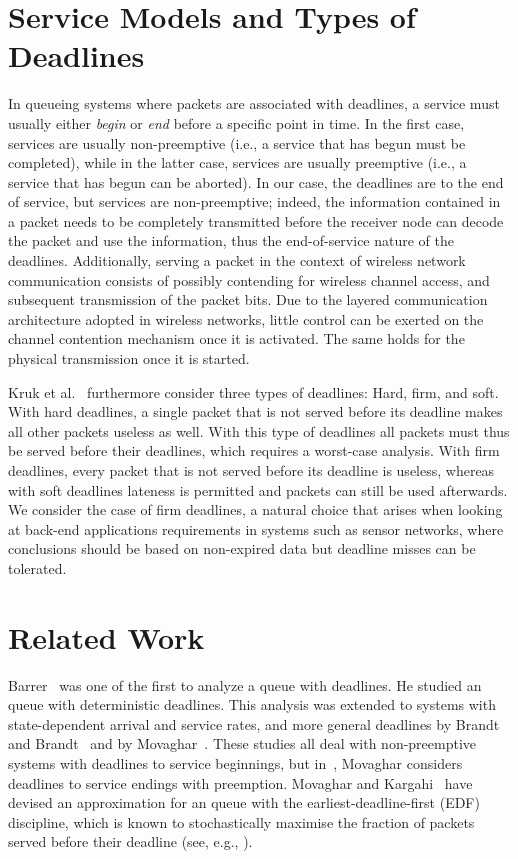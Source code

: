 \documentclass[preprint,12pt]{elsarticle}
\theoremstyle{definition}
\theoremstyle{plain}
\theoremstyle{remark}
\begin{document}
\section{Service Models and Types of Deadlines}\label{section:deadlines}
In queueing systems where packets are associated with deadlines, a service must usually either \emph{begin} or \emph{end} before a specific point in time. In the first case, services are usually non-preemptive (i.e., a service that has begun must be completed), while in the latter case, services are usually preemptive (i.e., a service that has begun can be aborted). In our case, the deadlines are to the end of service, but services are non-preemptive; indeed, the information contained in a packet needs to be completely transmitted before the receiver node can decode the packet and use the information, thus the end-of-service nature of the deadlines. Additionally, serving a packet in the context of wireless network communication consists of possibly contending for wireless channel access, and subsequent transmission of the packet bits. Due to the layered communication architecture adopted in wireless networks, little control can be exerted on the channel contention mechanism once it is activated. The same holds for the physical transmission once it is started.

Kruk et al.~\cite{kruk_edf_heavy_traffic_networks} furthermore consider three types of deadlines: Hard, firm, and soft. With hard deadlines, a single packet that is not served before its deadline makes all other packets useless as well. With this type of deadlines all packets must thus be served before their deadlines, which requires a worst-case analysis. With firm deadlines, every packet that is not served before its deadline is useless, whereas with soft deadlines lateness is permitted and packets can still be used afterwards. We consider the case of firm deadlines, a natural choice that arises when looking at back-end applications requirements in systems such as sensor networks, where conclusions should be based on non-expired data but deadline misses can be tolerated.

\section{Related Work} \label{section:related-works}
Barrer~\cite{Barrer_indifferent_clerks,Barrer_ordered_service} was one of the first to analyze a queue with deadlines. He studied an  queue with deterministic deadlines. This analysis was extended to systems with state-dependent arrival and service rates, and more general deadlines by Brandt and Brandt~\cite{Brandt_MMs,Brandt_MMs_deadlines} and by Movaghar~\cite{movaghar_beginnings_fifo}. These studies all deal with non-preemptive systems with deadlines to service beginnings, but in~\cite{movaghar_end_fifo}, Movaghar considers deadlines to service endings with preemption. Movaghar and Kargahi~\cite{Kargahi_movaghar,Kargahi_movaghar_edf} have devised an approximation for an  queue with the earliest-deadline-first (EDF) discipline, which is known to stochastically maximise the fraction of packets served before their deadline (see, e.g., \cite{panwar_towsley_wolf}).
\end{document}
